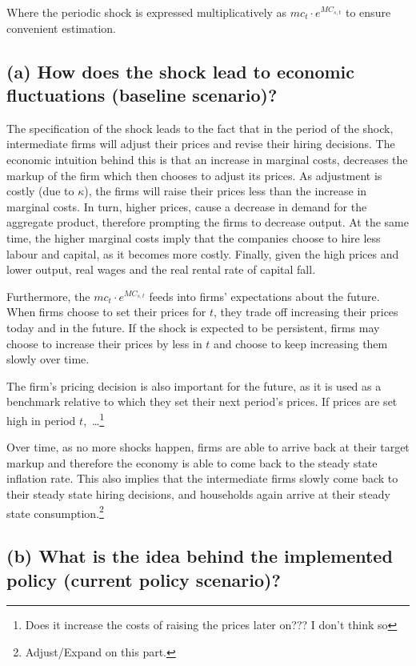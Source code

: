 \documentclass[12pt]{article}
\begin{document}
Where the periodic shock is expressed multiplicatively as $mc_t \cdot e^{MC_{s, t}}$ to ensure convenient estimation.

\subsection*{(a) How does the shock lead to economic fluctuations (baseline scenario)?}

The specification of the shock leads to the fact that in the period of the shock, intermediate firms will adjust their prices and revise their hiring decisions. The economic intuition behind this is that an increase in marginal costs, decreases the markup of the firm which then chooses to adjust its prices. As adjustment is costly (due to $\kappa$), the firms will raise their prices less than the increase in marginal costs. In turn, higher prices, cause a decrease in demand for the aggregate product, therefore prompting the firms to decrease output. At the same time, the higher marginal costs imply that the companies choose to hire less labour and capital, as it becomes more costly. Finally, given the high prices and lower output, real wages and the real rental rate of capital fall.

Furthermore, the $mc_t \cdot e^{MC_{s, t}}$ feeds into firms' expectations about the future. When firms choose to set their prices for $t$, they trade off increasing their prices today and in the future. If the shock is expected to be persistent, firms may choose to increase their prices by less in $t$ and choose to keep increasing them slowly over time. 

The firm's pricing decision is also important for the future, as it is used as a benchmark relative to which they set their next period's prices. If prices are set high in period $t$,\ \dots\footnote{Does it increase the costs of raising the prices later on??? I don't think so}

Over time, as no more shocks happen, firms are able to arrive back at their target markup and therefore the economy is able to come back to the steady state inflation rate. This also implies that the intermediate firms slowly come back to their steady state hiring decisions, and households again arrive at their steady state consumption.\footnote{Adjust/Expand on this part.}

\subsection*{(b) What is the idea behind the implemented policy (current policy scenario)?}
\end{document}
